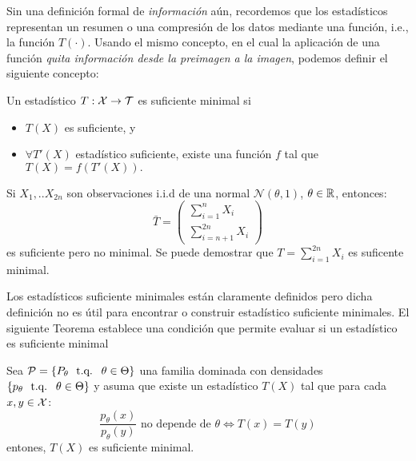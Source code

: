 Sin una definición formal de \textit{información} aún, recordemos que los estadísticos representan un resumen o una compresión  de los datos mediante una función, i.e., la función $T(\cdot)$. Usando el mismo concepto, en el cual la aplicación de una función \textit{quita información desde la preimagen a la imagen}, podemos definir el siguiente concepto:

\begin{definition}
	Un estadístico $T:{\mathcal X}\rightarrow{\mathcal T}$ es suficiente minimal si

	\begin{itemize}
		\item $T(X)$ es suficiente, y
		\item $\forall T'(X)$ estadístico suficiente, existe una función $f$ tal que $T(X) = f(T'(X)).$ 
	\end{itemize}
\end{definition}  

\begin{example}
Si $X_1,..X_{2n}$ son observaciones i.i.d de una normal $\mathcal{N}(\theta,1)$, $\theta \in {\mathbb R}$, entonces:
$$
\bar{T}=
\begin{pmatrix}
\sum_{i=1}^{n} X_i\\ 
\sum_{i=n+1}^{2n}X_i
\end{pmatrix}
$$
es suficiente pero no minimal. Se puede demostrar que $T=\sum_{i=1}^{2n} X_i$ es suficente minimal. 
\end{example}

Los estadísticos suficiente minimales están claramente definidos pero dicha definición no es útil para encontrar o construir  estadístico suficiente minimales. El siguiente Teorema establece una condición que permite evaluar si un estadístico es suficiente minimal 

\begin{theorem}
	\label{teo:suficiencia_minimal}
	Sea $\mathcal{P} = \{P_\theta\ {\text{ t.q. }}\ \theta\in\Theta\}$ una familia dominada con densidades $\{p_\theta\ {\text{ t.q. }}\ \theta\in\Theta\}$ y asuma que existe un estadístico $T(X)$ tal que para cada $x,y\in{\mathcal X}$:
	\begin{equation}
		\frac{p_\theta(x)}{p_\theta(y)} \text{ no depende de }\theta \Leftrightarrow T(x) = T(y)
	\end{equation}
	entones, $T(X)$ es suficiente minimal.
\end{theorem}

